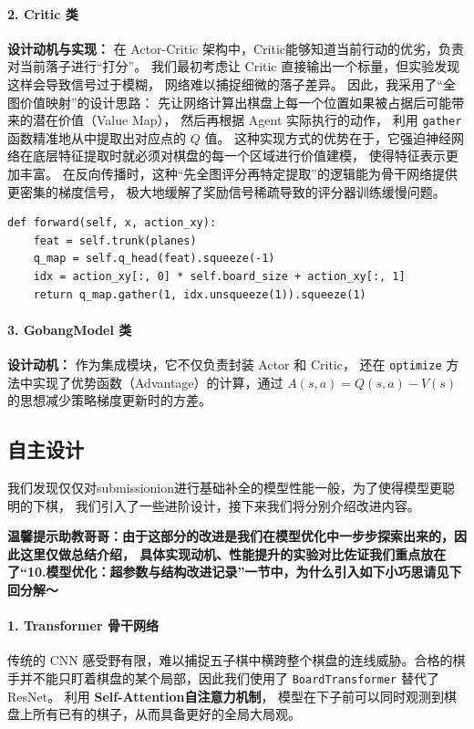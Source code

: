 \documentclass{article}
\begin{document}
\paragraph{2. Critic 类}
\textbf{设计动机与实现：} 在 Actor-Critic 架构中，Critic能够知道当前行动的优劣，负责对当前落子进行“打分”。
我们最初考虑让 Critic 直接输出一个标量，但实验发现这样会导致信号过于模糊，
网络难以捕捉细微的落子差异。
因此，我采用了“全图价值映射”的设计思路：
先让网络计算出棋盘上每一个位置如果被占据后可能带来的潜在价值（Value Map），
然后再根据 Agent 实际执行的动作，
利用 \texttt{gather} 函数精准地从中提取出对应点的 $Q$ 值。
这种实现方式的优势在于，它强迫神经网络在底层特征提取时就必须对棋盘的每一个区域进行价值建模，
使得特征表示更加丰富。
在反向传播时，这种“先全图评分再特定提取”的逻辑能为骨干网络提供更密集的梯度信号，
极大地缓解了奖励信号稀疏导致的评分器训练缓慢问题。

\begin{lstlisting}[caption=Critic 类的核心实现]
def forward(self, x, action_xy):
    feat = self.trunk(planes)
    q_map = self.q_head(feat).squeeze(-1)
    idx = action_xy[:, 0] * self.board_size + action_xy[:, 1]
    return q_map.gather(1, idx.unsqueeze(1)).squeeze(1)
\end{lstlisting}

\paragraph{3. GobangModel 类}
\textbf{设计动机：} 作为集成模块，它不仅负责封装 Actor 和 Critic，
还在 \texttt{optimize} 方法中实现了优势函数（Advantage）的计算，通过 $A(s,a) = Q(s,a) - V(s)$ 的思想减少策略梯度更新时的方差。

\subsection{自主设计}

我们发现仅仅对submissionion进行基础补全的模型性能一般，为了使得模型更聪明的下棋，
我们引入了一些进阶设计，接下来我们将分别介绍改进内容。

\textbf{温馨提示助教哥哥：由于这部分的改进是我们在模型优化中一步步探索出来的，因此这里仅做总结介绍，
具体实现动机、性能提升的实验对比佐证我们重点放在了“10.模型优化：超参数与结构改进记录”一节中，为什么引入如下小巧思请见下回分解～}

\paragraph{1. Transformer 骨干网络}
传统的 CNN 感受野有限，难以捕捉五子棋中横跨整个棋盘的连线威胁。合格的棋手并不能只盯着棋盘的某个局部，因此我们使用了 \texttt{BoardTransformer} 替代了 ResNet。
利用 \textbf{Self-Attention自注意力机制}，
模型在下子前可以同时观测到棋盘上所有已有的棋子，从而具备更好的全局大局观。
\end{document}
